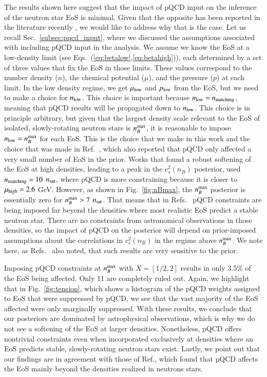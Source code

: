 \documentclass[aps,prd,nofootinbib,tightenlines,notitlepage,floatfix,superscriptaddress,showkeys,twocolumn]{revtex4-1}
\begin{document}
The results shown here suggest that the impact of pQCD input on the inference of the neutron star EoS is minimal. Given that the opposite has been reported in the literature recently \cite{Gorda:2022jvk,Annala:2023cwx,Altiparmak:2022bke}, we would like to address why that is the case. 
Let us recall Sec.~\ref{subsec:pqcd_input}, where we discussed the assumptions associated with including pQCD input in the analysis. We assume we know the EoS at a low-density limit (see Eqs.~(\ref{eq:betalow},\ref{eq:betahigh})), each determined by a set of three values that fix the EoS in those limits. These values correspond to the number density ($n$), the chemical potential ($\mu$), and the pressure ($p$) at each limit. In the low density regime, we get $\mu_{\rm low}$ and $p_{\rm low}$ from the EoS, but we need to make a choice for $n_{\rm low}$. This choice is important because $n_{\rm low} = n_{\rm matching}$, meaning that pQCD results will be propagated down to $n_{\rm low}$. This choice is in principle arbitrary, but given that the largest density scale relevant to the EoS of isolated, slowly-rotating neutron stars is $n_B^{\rm max}$, it is reasonable to impose $n_{\rm low} = n_B^{\rm max}$ for each EoS. This is the choice that we make in this work and the choice that was made in Ref.~\cite{Somasundaram:2022ztm}, which also reported that pQCD only affected a very small number of EoS in the prior. Works that found a robust softening of the EoS at high densities, leading to a peak in the $c_s^2(n_B)$ posterior, used $n_{\rm matching} = 10$ $n_{\rm sat}$, where pQCD is more constraining because it is closer to $\mu_{\rm high} = 2.6$ GeV. However, as shown in Fig.~\ref{fig:nBmax}, the $n_B^{\rm max}$ posterior is essentially zero for $n_B^{\rm max}> 7$ $n_{\rm sat}$. That means that in Refs.~\cite{Gorda:2022jvk,Annala:2023cwx,Altiparmak:2022bke} pQCD constraints are being imposed far beyond the densities where most realistic EoS predict a stable neutron star. There are no constraints from astronomical observations in those densities, so the impact of pQCD on the posterior will depend on prior-imposed assumptions about the correlations in $c_s^2(n_B)$ in the regime above $n_B^{\rm max}$. We note here, as Refs.~\cite{Essick:2023fso,Brandes:2023hma} also noted, that such results are very sensitive to the prior. 

Imposing pQCD constraints at $n_B^{\rm max}$ with $X = [1/2,2]$ results in only 3.5\% of the EoS being affected. Only 11 are completely ruled out. Again, we highlight that in Fig.~\ref{fig:tension}, which shows a histogram of the pQCD weights assigned to EoS that were suppressed by pQCD, we see that the vast majority of the EoS affected were only marginally suppressed. With these results, we conclude that our posteriors are dominated by astrophysical observations, which is why we do not see a softening of the EoS at larger densities.
Nonetheless, pQCD offers nontrivial constraints even when incorporated exclusively at densities where an EoS predicts stable, slowly-rotating neutron stars exist. Lastly, we point out that our findings are in agreement with those of Ref.\cite{Somasundaram:2022ztm}, which found that pQCD affects the EoS mainly beyond the densities realized in neutrons stars.
\end{document}
